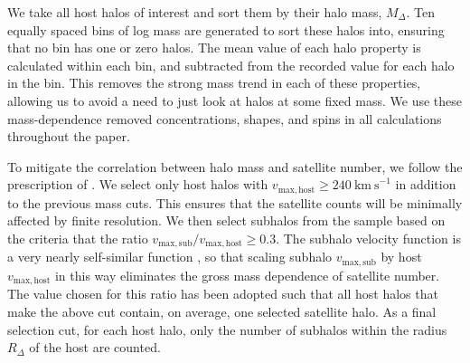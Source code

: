 \documentclass[usenatbib,usegraphicx,letterpaper]{mn2e}
\begin{document}
We take all host halos of interest and sort them by their halo mass, $M_{\Delta}$. 
Ten equally spaced bins of log mass are generated to sort these halos into, ensuring that no bin has one or zero
halos. The mean value of each halo property is calculated within each bin, and subtracted from the recorded value
for each halo in the bin. This removes the strong mass trend in each of these properties, allowing us to avoid a
need to just look at halos at some fixed mass. We use these mass-dependence removed concentrations, shapes, and
spins in all calculations throughout the paper.


To mitigate the correlation between halo mass and satellite number, 
we follow the prescription of \citet{wechsler06}. We select only host halos 
with $v_{\mathrm{max,host}} \ge 240 \ \mathrm{km \ s}^{-1}$ in addition to the previous mass cuts. 
This ensures that the satellite counts will be minimally affected by finite resolution. We then select subhalos
from the sample based on the criteria that the ratio $v_{\mathrm{max,sub}} / v_{\mathrm{max,host}} \ge 0.3$. The
subhalo velocity function is a very nearly self-similar function \citep{zentner05} , so that scaling subhalo $v_{\mathrm{max,sub}}$ by host
$v_{\mathrm{max,host}}$ in this way eliminates the gross mass dependence of satellite number. The value chosen
for this ratio has been adopted such that all host halos that make the above cut contain, on average, one
selected satellite halo. As a final selection cut, for each host halo, only the number of subhalos within the
radius $R_{\Delta}$ of the host are counted. 
\end{document}
